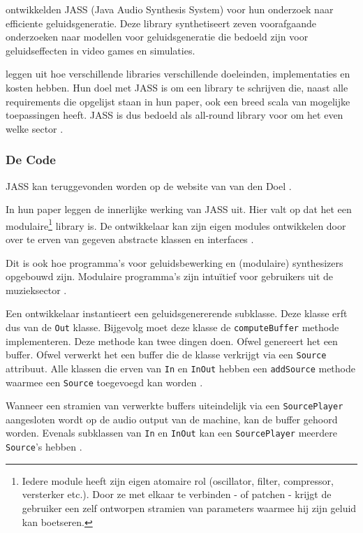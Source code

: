 \textcite{jass} ontwikkelden JASS (Java Audio Synthesis System) voor hun onderzoek naar efficiente geluidsgeneratie. Deze library synthetiseert zeven voorafgaande onderzoeken naar modellen voor geluidsgeneratie die bedoeld zijn voor geluidseffecten in video games en simulaties. 

\textcite{jass} leggen uit hoe verschillende libraries verschillende doeleinden, implementaties en kosten hebben. Hun doel met JASS is om een library te schrijven die, naast alle requirements die opgelijst staan in hun paper, ook een breed scala van mogelijke toepassingen heeft. JASS is dus bedoeld als all-round library voor om het even welke sector \autocite{jass}.

\subsubsection*{De Code}
\label{sec:jass_code}

JASS kan teruggevonden worden op de website van van den Doel \autocite{jasscode}.

In hun paper leggen \textcite{jass} de innerlijke werking van JASS uit. Hier valt op dat het een modulaire\footnote{Iedere module heeft zijn eigen atomaire rol (oscillator, filter, compressor, versterker etc.). Door ze met elkaar te verbinden - of patchen - krijgt de gebruiker een zelf ontworpen stramien van parameters waarmee hij zijn geluid kan boetseren.} library is. De ontwikkelaar kan zijn eigen modules ontwikkelen door over te erven van gegeven abstracte klassen en interfaces  \autocite{jass}. 

Dit is ook hoe programma's voor geluidsbewerking en (modulaire) synthesizers opgebouwd zijn. Modulaire programma's zijn intuïtief voor gebruikers uit de muzieksector \autocite{bartvincent}.

Een ontwikkelaar instantieert een geluidsgenererende subklasse. Deze klasse erft dus van de \verb+Out+ klasse. Bijgevolg moet deze klasse de \verb+computeBuffer+ methode implementeren. Deze methode kan twee dingen doen. Ofwel genereert het een buffer. Ofwel verwerkt het een buffer die de klasse verkrijgt via een \verb+Source+ attribuut. Alle klassen die erven van \verb+In+ en \verb+InOut+ hebben een \verb+addSource+ methode waarmee een \verb+Source+ toegevoegd kan worden \autocite{jass}.

Wanneer een stramien van verwerkte buffers uiteindelijk via een \verb+SourcePlayer+ aangesloten wordt op de audio output van de machine, kan de buffer gehoord worden. Evenals subklassen van \verb+In+ en \verb+InOut+ kan een \verb+SourcePlayer+ meerdere \verb+Source+'s hebben \autocite{jass}.

